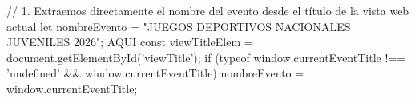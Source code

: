  // 1. Extraemos directamente el nombre del evento desde el título de la vista web actual
    let nombreEvento = "JUEGOS DEPORTIVOS NACIONALES JUVENILES 2026"; AQUI 
    const viewTitleElem = document.getElementById('viewTitle');
    if (typeof window.currentEventTitle !== 'undefined' && window.currentEventTitle) {
        nombreEvento = window.currentEventTitle;
    }
